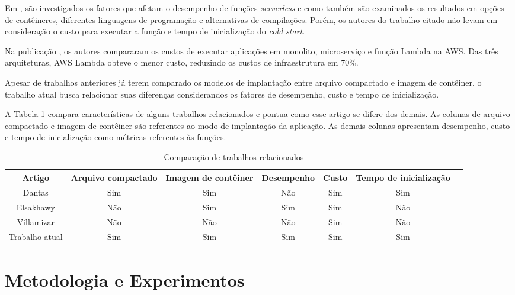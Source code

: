 \documentclass[10pt,conference]{IEEEtran}
\begin{document}
Em \cite{Elsakhawy_2021_performance_analysis_serverless}, são investigados os fatores que afetam o desempenho de funções \textit{serverless} e como também são examinados os resultados em opções de contêineres, diferentes linguagens de programação e alternativas de compilações. Porém, os autores do trabalho citado não levam em consideração o custo para executar a função e tempo de inicialização do \textit{cold start}.

Na publicação \cite{Villamizar_2017_cost_comparison_lambda}, os autores compararam os custos de executar aplicações em monolito, microserviço e função Lambda na AWS. Das três arquiteturas, AWS Lambda obteve o menor custo, reduzindo os custos de infraestrutura em 70\%.

Apesar de trabalhos anteriores já terem comparado os modelos de implantação entre arquivo compactado e imagem de contêiner, o trabalho atual busca relacionar suas diferenças considerandos os fatores de desempenho, custo e tempo de inicialização.

A Tabela \ref{tab:related_papers} compara características de alguns trabalhos relacionados e pontua como esse artigo se difere dos demais. As colunas de arquivo compactado e imagem de contêiner são referentes ao modo de implantação da aplicação. As demais colunas apresentam desempenho, custo e tempo de inicialização como métricas referentes às funções.

\begin{table}[htb]
    \centering
    \caption{Comparação de trabalhos relacionados}
    \label{tab:related_papers}
    \begin{tabular}{ccccccc}
        \hline
         Artigo & Arquivo compactado & Imagem de contêiner & Desempenho & Custo & Tempo de inicialização \\
        \hline
         Dantas\cite{dantas_2022_reducing_cold_start} & Sim & Sim & Não & Sim & Sim \\
        \hline
         Elsakhawy\cite{Elsakhawy_2021_performance_analysis_serverless} & Não  & Sim & Sim & Sim & Não \\
        \hline
         Villamizar\cite{Villamizar_2017_cost_comparison_lambda} & Não & Não & Não & Sim & Não \\
        \hline
         Trabalho atual & Sim & Sim & Sim & Sim & Sim \\
        \hline
    \end{tabular}   
\end{table}

\section{Metodologia e Experimentos}
\label{sec:experiments}
\end{document}
